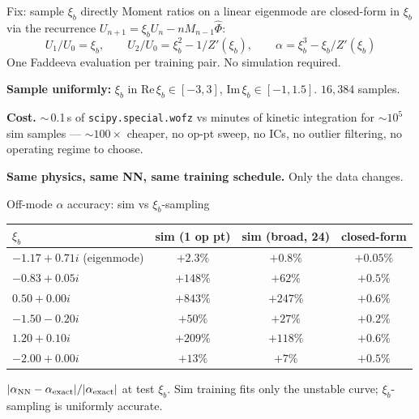 \documentclass[10pt, aspectratio=169]{beamer}
\newcommand{\xib}{\xi_b}
\begin{document}
\begin{frame}{Fix: sample $\xib$ directly}
  \footnotesize
  Moment ratios on a linear eigenmode are closed-form in $\xib$ via the
  recurrence $U_{n+1} = \xib U_n - n M_{n-1}\hat\Phi$:
  \[
    U_1/U_0 = \xib, \qquad U_2/U_0 = \xib^2 - 1/Z'(\xib),
    \qquad \alpha = \xib^3 - \xib/Z'(\xib)
  \]
  One Faddeeva evaluation per training pair. No simulation required.

  \vspace{0.5em}
  \textbf{Sample uniformly:} $\xib$ in
  $\mathrm{Re}\,\xib\in[-3,3]$, $\mathrm{Im}\,\xib\in[-1,1.5]$. $16{,}384$
  samples.

  \vspace{0.5em}
  \textbf{Cost.} $\sim$\,0.1\,s of \texttt{scipy.special.wofz} vs minutes
  of kinetic integration for $\sim 10^5$ sim samples --- $\sim\!100\times$
  cheaper, no op-pt sweep, no ICs, no outlier filtering, no operating
  regime to choose.

  \vspace{0.3em}
  \textbf{Same physics, same NN, same training schedule.} Only the data
  changes.
\end{frame}

\begin{frame}{Off-mode $\alpha$ accuracy: sim vs $\xib$-sampling}
  \begin{center}\small
  \begin{tabular}{lccc}
    \toprule
    $\xib$ & sim (1 op pt) & sim (broad, 24) & closed-form \\
    \midrule
    $-1.17 + 0.71i$ (eigenmode) & $+2.3\%$  & $+0.8\%$  & $+0.05\%$ \\
    $-0.83 + 0.05i$ & $+148\%$  & $+62\%$   & $+0.5\%$ \\
    $0.50 + 0.00i$  & $+843\%$  & $+247\%$  & $+0.6\%$ \\
    $-1.50 - 0.20i$ & $+50\%$   & $+27\%$   & $+0.2\%$ \\
    $1.20 + 0.10i$  & $+209\%$  & $+118\%$  & $+0.6\%$ \\
    $-2.00 + 0.00i$ & $+13\%$   & $+7\%$    & $+0.5\%$ \\
    \bottomrule
  \end{tabular}
  \end{center}
  \vspace{0.4em}\footnotesize
  $|\alpha_{\rm NN} - \alpha_{\rm exact}|/|\alpha_{\rm exact}|$ at test
  $\xib$. Sim training fits only the unstable curve; $\xib$-sampling is
  uniformly accurate.
\end{frame}
\end{document}
